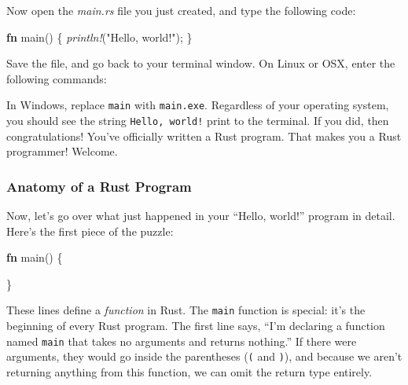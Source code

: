 \documentclass[a4paper,]{book}
\newenvironment{Shaded}{\begin{snugshade}}{\end{snugshade}}
\newcommand{\KeywordTok}[1]{\textcolor[rgb]{0.13,0.29,0.53}{\textbf{{#1}}}}
\newcommand{\StringTok}[1]{\textcolor[rgb]{0.31,0.60,0.02}{{#1}}}
\newcommand{\PreprocessorTok}[1]{\textcolor[rgb]{0.56,0.35,0.01}{\textit{{#1}}}}
\newcommand{\NormalTok}[1]{{#1}}
\begin{document}
Now open the \emph{main.rs} file you just created, and type the
following code:

\begin{Shaded}
\begin{Highlighting}[]
\KeywordTok{fn} \NormalTok{main() \{}
    \PreprocessorTok{println!}\NormalTok{(}\StringTok{"Hello, world!"}\NormalTok{);}
\NormalTok{\}}
\end{Highlighting}
\end{Shaded}

Save the file, and go back to your terminal window. On Linux or OSX,
enter the following commands:

\begin{Shaded}
\end{Shaded}

In Windows, replace \texttt{main} with \texttt{main.exe}. Regardless of
your operating system, you should see the string \texttt{Hello,\ world!}
print to the terminal. If you did, then congratulations! You've
officially written a Rust program. That makes you a Rust programmer!
Welcome.

\subsubsection{Anatomy of a Rust
Program}\label{anatomy-of-a-rust-program}

Now, let's go over what just happened in your ``Hello, world!'' program
in detail. Here's the first piece of the puzzle:

\begin{Shaded}
\begin{Highlighting}[]
\KeywordTok{fn} \NormalTok{main() \{}

\NormalTok{\}}
\end{Highlighting}
\end{Shaded}

These lines define a \emph{function} in Rust. The \texttt{main} function
is special: it's the beginning of every Rust program. The first line
says, ``I'm declaring a function named \texttt{main} that takes no
arguments and returns nothing.'' If there were arguments, they would go
inside the parentheses (\texttt{(} and \texttt{)}), and because we
aren't returning anything from this function, we can omit the return
type entirely.
\end{document}

